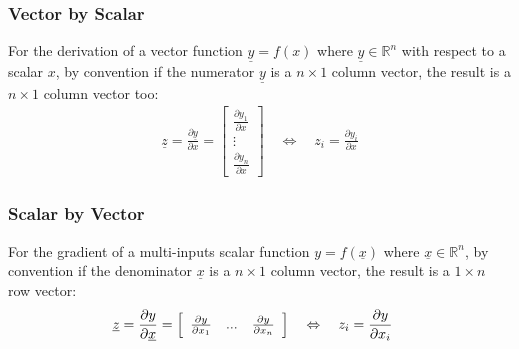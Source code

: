 \subsubsection{Vector by Scalar}

For the derivation of a vector function $\underline{y} = f(x)$ where $\underline{y} \in \mathbb{R}^n$ with respect to a scalar $x$, by convention if the numerator $\underline{y}$ is a $n \times 1$ column vector, the result is a $n \times 1$ column vector too:
\begin{align}
\underline{z} = \frac{\partial \underline{y}}{\partial x} =  
 \left[ \begin{array}{c } 
  \frac{\partial y_1}{\partial x}   \\ \vdots \\ \frac{\partial y_n}{\partial x}
 \end{array} \right]
 \quad\Leftrightarrow\quad
 z_{i} = \frac{\partial y_i}{\partial x}
\end{align}


\subsubsection{Scalar by Vector}

For the gradient of a multi-inputs scalar function $y = f(\underline{x})$ where $\underline{x} \in \mathbb{R}^n$, by convention if the denominator $\underline{x}$ is a $n \times 1$ column vector, the result is a $1 \times n$ row vector:
\begin{align}
\underline{z} = \frac{\partial y}{\partial \underline{x}} &= 
 \left[ \begin{array}{c c c } 
  \frac{\partial y}{\partial x_1}   & ... & \frac{\partial y}{\partial x_n}
 \end{array} \right]
 \quad \Leftrightarrow\quad
 z_i = \frac{\partial y}{\partial x_i}
\end{align}

